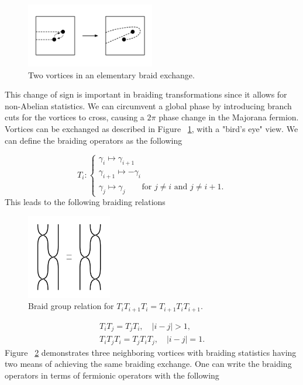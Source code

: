 \begin{figure}
  \includegraphics[width=0.5\textwidth]{./figures/pwave-braid.pdf}
  \caption{Two vortices in an elementary braid exchange.}
  \label{fig:pwave-braid}
\end{figure}


This change of sign is important in braiding transformations since it allows for non-Abelian statistics.
We can circumvent a global phase by introducing branch cuts for the vortices to cross, causing a $2\pi$ phase change in the Majorana fermion.
Vortices can be exchanged as described in Figure ~\ref{fig:pwave-braid}, with a "bird's eye" view.
We can define the braiding operators as the following

\begin{equation}
  T_i :
  \begin{cases}
    \gamma_i \mapsto \gamma_{i+1} \\
    \gamma_{i+1} \mapsto -\gamma_i \\
    \gamma_j \mapsto \gamma_j \quad\quad \text{for $j\neq i$ and $j\neq i+1$}.
  \end{cases}
\end{equation}
This leads to the following braiding relations

\begin{figure}
  \includegraphics[width=0.33\textwidth]{./figures/braid.pdf}
  \caption{Braid group relation for $T_i T_{i+1} T_i = T_{i+1} T_i T_{i+1}$.}
  \label{fig:braid}
\end{figure}
\begin{equation}
  \begin{align*}
    T_i T_j = T_j T_i, \quad |i-j| > 1, \\
    T_i T_j T_i = T_j T_i T_j, \quad |i-j| = 1.
  \end{align*}
\end{equation}
Figure ~\ref{fig:braid} demonstrates three neighboring vortices with braiding statistics having two means of achieving the same braiding exchange.
One can write the braiding operators in terms of fermionic operators with the following

